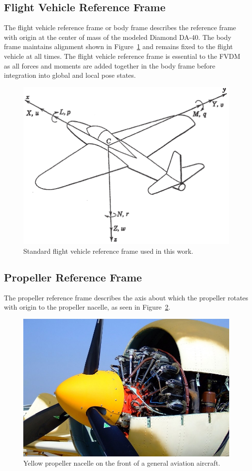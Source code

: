 \documentclass[12pt]{report}
\begin{document}
\subsection{Flight Vehicle Reference Frame}
The flight vehicle reference frame or body frame describes the reference frame with origin at the center of mass of the modeled Diamond DA-40. The body frame maintains alignment shown in Figure~\ref{fig:flightvehiclereferenceframe} and remains fixed to the flight vehicle at all times. The flight vehicle reference frame is essential to the FVDM as all forces and moments are added together in the body frame before integration into global and local pose states.

\begin{figure}[!ht]\label{fig:flightvehiclereferenceframe}
  \centering
  \includegraphics[width=0.85\linewidth]{Figures/bodyframe.png}
  \caption{Standard flight vehicle reference frame used in this work.~\cite{peetSpacecraftAircraftDynamics}}
\end{figure}

\subsection{Propeller Reference Frame}
The propeller reference frame describes the axis about which the propeller rotates with origin to the propeller nacelle, as seen in Figure~\ref{fig:propnacelle}.

\begin{figure}[!ht]\label{fig:propnacelle}
  \centering
  \includegraphics[width=0.65\linewidth]{Figures/propnacelle.jpg}
  \caption{Yellow propeller nacelle on the front of a general aviation aircraft.}
\end{figure}
\end{document}
